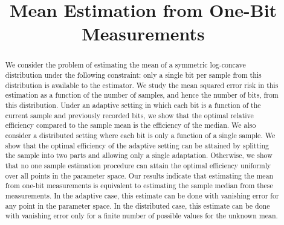\documentclass[letterpaper, 11pt]{IEEEtran}      %
\author{
    \IEEEauthorblockN{
Alon Kipnis\IEEEauthorrefmark{1} and   
    John C. Duchi\IEEEauthorrefmark{1}\IEEEauthorrefmark{2}  \\}
    \IEEEauthorblockA{\IEEEauthorrefmark{1}Stanford University, Department of Statistics \\}
    \IEEEauthorblockA{\IEEEauthorrefmark{2}Stanford University, Department of Electrical Engineering. }
}
\title{\LARGE \bf Mean Estimation from One-Bit Measurements}
\begin{document}
\graphicspath{{./Figs/}}
\maketitle
\thispagestyle{empty}
\pagestyle{empty}


\begin{abstract}
We consider the problem of estimating the mean of a symmetric log-concave distribution under the following constraint: only a single bit per sample from this distribution is available to the estimator. We study the mean squared error risk in this estimation as a function of the number of samples, and hence the number of bits, from this distribution. 
%
Under an adaptive setting in which each bit is a function of the current sample and previously recorded bits, we show that the optimal relative efficiency compared to the sample mean is the efficiency of the median. %
%
We also consider a distributed setting where each bit is only a function of a single sample. We show that the optimal efficiency of the adaptive setting can be attained by splitting the sample into two parts and allowing only a single adaptation. Otherwise, we show that no one sample estimation procedure can attain the optimal efficiency uniformly over all points in the parameter space.
%
%
Our results indicate that estimating the mean from one-bit measurements is equivalent to estimating the sample median from these measurements. In the adaptive case, this estimate can be done with vanishing error for any point in the parameter space. In the distributed case, this estimate can be done with vanishing error only for a finite number of possible values for the unknown mean. 
\end{abstract}



\end{document}
